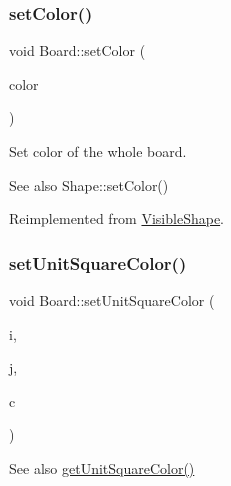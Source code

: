 \subsubsection{\texorpdfstring{set\+Color()}{setColor()}}
{\footnotesize\ttfamily void Board\+::set\+Color (\begin{DoxyParamCaption}\item[{const \mbox{\hyperlink{class_r_g_b_color}{R\+G\+B\+Color}} \&}]{color }\end{DoxyParamCaption})\hspace{0.3cm}{\ttfamily [virtual]}}



Set color of the whole board. 

\begin{DoxySeeAlso}{See also}
Shape\+::set\+Color() 
\end{DoxySeeAlso}


Reimplemented from \mbox{\hyperlink{class_visible_shape_a69ae0940d090fec376bee8dc6861b8dc}{Visible\+Shape}}.

\mbox{\label{class_board_a9c8fc3e645f56bec246a27459f5c75ec}} 
\subsubsection{\texorpdfstring{set\+Unit\+Square\+Color()}{setUnitSquareColor()}}
{\footnotesize\ttfamily void Board\+::set\+Unit\+Square\+Color (\begin{DoxyParamCaption}\item[{const int \&}]{i,  }\item[{const int \&}]{j,  }\item[{const \mbox{\hyperlink{class_r_g_b_color}{R\+G\+B\+Color}} \&}]{c }\end{DoxyParamCaption})\hspace{0.3cm}{\ttfamily [virtual]}}

\begin{DoxySeeAlso}{See also}
\mbox{\hyperlink{class_board_a6e6a947ec66c09bff4559fd9650b9b1d}{get\+Unit\+Square\+Color()}} 
\end{DoxySeeAlso}
\mbox{\label{class_board_adc9d11f72af8b96fdb379330fd9de592}} 
